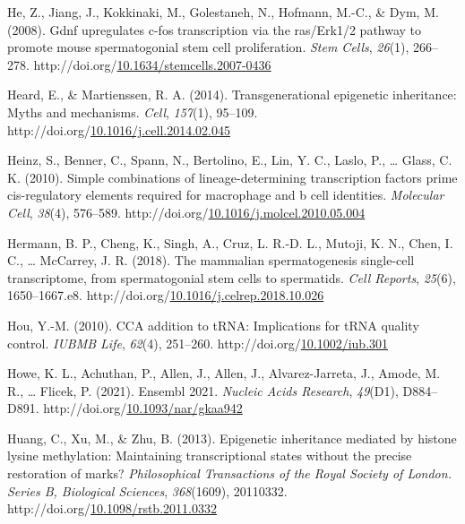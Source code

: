 \documentclass[12pt,twoside]{reedthesis}
\newlength{\cslhangindent}
\newenvironment{CSLReferences}[2] %
 {%
  \setlength{\parindent}{0pt}
  \ifodd #1 \everypar{\setlength{\hangindent}{\cslhangindent}}\ignorespaces\fi
  \ifnum #2 > 0
  \setlength{\parskip}{#2\baselineskip}
  \fi
 }%
 {}
\begin{document}
\begin{CSLReferences}{1}{0}
\leavevmode{}%
He, Z., Jiang, J., Kokkinaki, M., Golestaneh, N., Hofmann, M.-C., \& Dym, M. (2008). Gdnf upregulates c-fos transcription via the ras/Erk1/2 pathway to promote mouse spermatogonial stem cell proliferation. \emph{Stem Cells}, \emph{26}(1), 266--278. http://doi.org/\href{https://doi.org/10.1634/stemcells.2007-0436}{10.1634/stemcells.2007-0436}

\leavevmode{}%
Heard, E., \& Martienssen, R. A. (2014). Transgenerational epigenetic inheritance: Myths and mechanisms. \emph{Cell}, \emph{157}(1), 95--109. http://doi.org/\href{https://doi.org/10.1016/j.cell.2014.02.045}{10.1016/j.cell.2014.02.045}

\leavevmode{}%
Heinz, S., Benner, C., Spann, N., Bertolino, E., Lin, Y. C., Laslo, P., \ldots{} Glass, C. K. (2010). Simple combinations of lineage-determining transcription factors prime cis-regulatory elements required for macrophage and b cell identities. \emph{Molecular Cell}, \emph{38}(4), 576--589. http://doi.org/\href{https://doi.org/10.1016/j.molcel.2010.05.004}{10.1016/j.molcel.2010.05.004}

\leavevmode{}%
Hermann, B. P., Cheng, K., Singh, A., Cruz, L. R.-D. L., Mutoji, K. N., Chen, I. C., \ldots{} McCarrey, J. R. (2018). The mammalian spermatogenesis single-cell transcriptome, from spermatogonial stem cells to spermatids. \emph{Cell Reports}, \emph{25}(6), 1650--1667.e8. http://doi.org/\href{https://doi.org/10.1016/j.celrep.2018.10.026}{10.1016/j.celrep.2018.10.026}

\leavevmode{}%
Hou, Y.-M. (2010). CCA addition to tRNA: Implications for tRNA quality control. \emph{IUBMB Life}, \emph{62}(4), 251--260. http://doi.org/\href{https://doi.org/10.1002/iub.301}{10.1002/iub.301}

\leavevmode{}%
Howe, K. L., Achuthan, P., Allen, J., Allen, J., Alvarez-Jarreta, J., Amode, M. R., \ldots{} Flicek, P. (2021). Ensembl 2021. \emph{Nucleic Acids Research}, \emph{49}(D1), D884--D891. http://doi.org/\href{https://doi.org/10.1093/nar/gkaa942}{10.1093/nar/gkaa942}

\leavevmode{}%
Huang, C., Xu, M., \& Zhu, B. (2013). Epigenetic inheritance mediated by histone lysine methylation: Maintaining transcriptional states without the precise restoration of marks? \emph{Philosophical Transactions of the Royal Society of London. Series B, Biological Sciences}, \emph{368}(1609), 20110332. http://doi.org/\href{https://doi.org/10.1098/rstb.2011.0332}{10.1098/rstb.2011.0332}


\end{CSLReferences}
\end{document}
